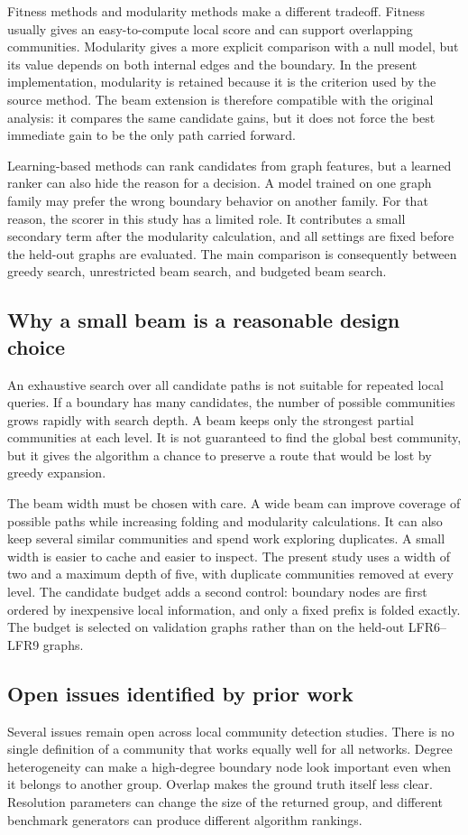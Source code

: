 \documentclass[10pt,journal,compsoc]{IEEEtran}
\begin{document}
Fitness methods and modularity methods make a different tradeoff. Fitness
usually gives an easy-to-compute local score and can support overlapping
communities. Modularity gives a more explicit comparison with a null model,
but its value depends on both internal edges and the boundary. In the present
implementation, modularity is retained because it is the criterion used by
the source method. The beam extension is therefore compatible with the
original analysis: it compares the same candidate gains, but it does not
force the best immediate gain to be the only path carried forward.

Learning-based methods can rank candidates from graph features, but a learned
ranker can also hide the reason for a decision. A model trained on one graph
family may prefer the wrong boundary behavior on another family. For that
reason, the scorer in this study has a limited role. It contributes a small
secondary term after the modularity calculation, and all settings are fixed
before the held-out graphs are evaluated. The main comparison is consequently
between greedy search, unrestricted beam search, and budgeted beam search.

\subsection{Why a small beam is a reasonable design choice}
An exhaustive search over all candidate paths is not suitable for repeated
local queries. If a boundary has many candidates, the number of possible
communities grows rapidly with search depth. A beam keeps only the strongest
partial communities at each level. It is not guaranteed to find the global
best community, but it gives the algorithm a chance to preserve a route that
would be lost by greedy expansion.

The beam width must be chosen with care. A wide beam can improve coverage of
possible paths while increasing folding and modularity calculations. It can
also keep several similar communities and spend work exploring duplicates. A
small width is easier to cache and easier to inspect. The present study uses a
width of two and a maximum depth of five, with duplicate communities removed
at every level. The candidate budget adds a second control: boundary nodes
are first ordered by inexpensive local information, and only a fixed prefix
is folded exactly. The budget is selected on validation graphs rather than on
the held-out LFR6--LFR9 graphs.

\subsection{Open issues identified by prior work}
Several issues remain open across local community detection studies. There is
no single definition of a community that works equally well for all networks.
Degree heterogeneity can make a high-degree boundary node look important even
when it belongs to another group. Overlap makes the ground truth itself less
clear. Resolution parameters can change the size of the returned group, and
different benchmark generators can produce different algorithm rankings.
\end{document}

